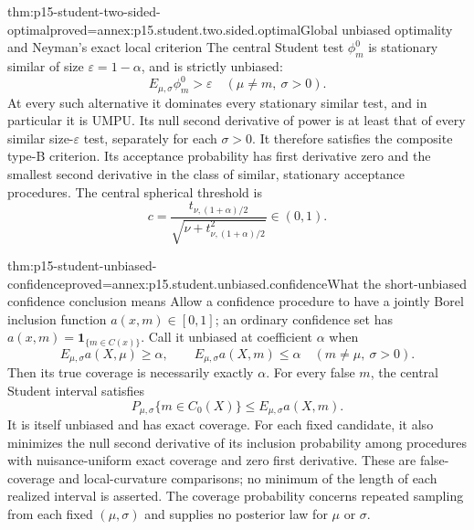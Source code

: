\begin{hbtheorem}{thm:p15-student-two-sided-optimal}{proved=annex:p15.student.two.sided.optimal}{Global unbiased optimality and Neyman's exact local criterion}
The central Student test \(\phi_m^0\) is stationary similar
of size \(\varepsilon=1-\alpha\), and is strictly unbiased:
\[
             E_{\mu,\sigma}\phi_m^0>\varepsilon
                  \quad(\mu\ne m,\ \sigma>0).
\]
At every such alternative it dominates every stationary
similar test, and in particular it is UMPU.
Its null second derivative of power is at least that of
every similar size-\(\varepsilon\) test, separately for each
\(\sigma>0\). It therefore satisfies the composite type-B
criterion. Its acceptance probability has first derivative
zero and the smallest second derivative in the class of
similar, stationary acceptance procedures.
The central spherical threshold is
\[
 c=\frac{t_{\nu,(1+\alpha)/2}}
              {\sqrt{\nu+t_{\nu,(1+\alpha)/2}^2}}\in(0,1).
\]
\end{hbtheorem}

\begin{hbtheorem}{thm:p15-student-unbiased-confidence}{proved=annex:p15.student.unbiased.confidence}{What the short-unbiased confidence conclusion means}
Allow a confidence procedure to have a jointly Borel inclusion
function \(a(x,m)\in[0,1]\); an ordinary confidence set has
\(a(x,m)=\mathbf1_{\{m\in C(x)\}}\). Call it unbiased at
coefficient \(\alpha\) when
\[
 E_{\mu,\sigma}a(X,\mu)\geq\alpha,\qquad
 E_{\mu,\sigma}a(X,m)\leq\alpha
                       \quad(m\ne\mu,\ \sigma>0).
\]
Then its true coverage is necessarily exactly \(\alpha\).
For every false \(m\), the central Student interval satisfies
\[
 P_{\mu,\sigma}\{m\in C_0(X)\}
                     \leq E_{\mu,\sigma}a(X,m).
\]
It is itself unbiased and has exact coverage.
For each fixed candidate, it also minimizes the null second
derivative of its inclusion probability among procedures
with nuisance-uniform exact coverage and zero first derivative.
These are false-coverage and local-curvature comparisons;
no minimum of the length of each realized interval is asserted.
The coverage probability concerns repeated sampling from
each fixed \((\mu,\sigma)\) and supplies no posterior law
for \(\mu\) or \(\sigma\).
\end{hbtheorem}

